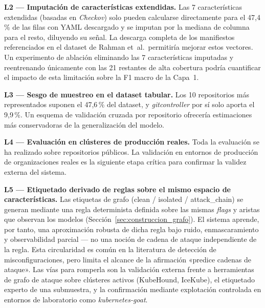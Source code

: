\textbf{L2 — Imputación de características extendidas.} Las 7 características
extendidas (basadas en \textit{Checkov}) solo pueden calcularse directamente para
el 47,4\,\% de las filas con \acs{YAML} descargado y se imputan por la mediana de
columna para el resto, diluyendo su señal. La descarga completa de los manifiestos
referenciados en el dataset de Rahman et~al.\ permitiría mejorar estos vectores.
Un experimento de ablación eliminando las 7 características imputadas y
reentrenando únicamente con las 21 restantes de alta cobertura podría cuantificar
el impacto de esta limitación sobre la F1 macro de la Capa~1.

\textbf{L3 — Sesgo de muestreo en el dataset tabular.} Los 10 repositorios más
representados suponen el 47,6\,\% del dataset, y \textit{gitcontroller} por sí solo
aporta el 9,9\,\%. Un esquema de validación cruzada por repositorio ofrecería
estimaciones más conservadoras de la generalización del modelo.

\textbf{L4 — Evaluación en clústeres de producción reales.} Toda la evaluación
se ha realizado sobre repositorios públicos. La validación en entornos de producción
de organizaciones reales es la siguiente etapa crítica para confirmar la validez
externa del sistema.

\textbf{L5 — Etiquetado derivado de reglas sobre el mismo espacio de
características.} Las etiquetas de grafo (clean / isolated / attack\_chain) se
generan mediante una regla determinista definida sobre las mismas \textit{flags} y
aristas que observan los modelos (Sección~\ref{sec:construccion_grafo}). El sistema aprende, por
tanto, una aproximación robusta de dicha regla bajo ruido, enmascaramiento y
observabilidad parcial — no una noción de cadena de ataque independiente de la
regla. Esta circularidad es común en la literatura de detección de
misconfiguraciones, pero limita el alcance de la afirmación «predice cadenas de
ataque». Las vías para romperla son la validación externa frente a herramientas de
grafo de ataque sobre clústeres activos (KubeHound, IceKube), el etiquetado experto
de una submuestra, y la confirmación mediante explotación controlada en entornos de
laboratorio como \textit{kubernetes-goat}.

